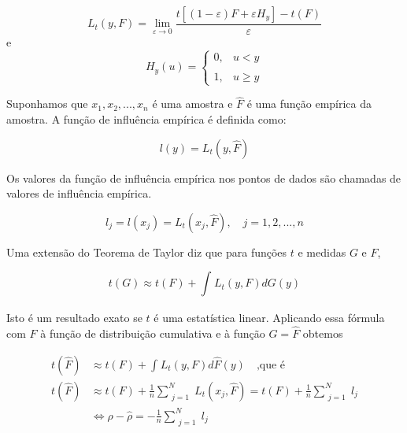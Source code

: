 \documentclass{article}
\begin{document}
\begin{enumerate}[(a)]
						\begin{equation*}
							L_t(y,F) = \lim_{\varepsilon \to 0} 
							\frac{t\left[(1 - \varepsilon)F + \varepsilon H_y \right] - t(F)}{\varepsilon}
						\end{equation*}	
						e
						\begin{equation*}
							H_y(u) = \begin{cases} 
										0, & u < y\\\\ 1, & u \geq y 
									\end{cases}
						\end{equation*}				
						
						Suponhamos que $x_1, x_2, ..., x_n$ é uma amostra e $\hat{F}$ é uma função empírica da amostra. A função de influência empírica é definida como:
						
						\begin{equation*}
							l(y) = L_t(y, \hat{F})
						\end{equation*}		
						
						Os valores da função de influência empírica nos pontos de dados são chamadas de valores de influência empírica.
						
						\begin{equation*}
							l_j = l(x_j) = L_t(x_j, \hat{F}), \quad j = 1,2,...,n
						\end{equation*}		
						
						Uma extensão do Teorema de Taylor diz que para funções $t$ e 
						medidas $G$ e $F$,
						
						\begin{equation*}
							t(G) \approx t(F) + \int^{}_{} L_t(y,F)dG(y)
						\end{equation*}		
						
						Isto é um resultado exato se $t$ é uma estatística linear.
						Aplicando essa fórmula com $F$ à função de distribuição cumulativa e à função $G = \hat{F}$ obtemos
						
						\begin{align*}
							t(\hat{F}) &\approx t(F) + \int^{}_{} L_t(y,F)d\hat{F}(y) 
							\quad \textrm{,que é}\\
							t(\hat{F}) &\approx t(F) + \frac{1}{n}
										\sum_{\substack{j=1}}^{N} L_t(x_j,\hat{F}) =
										t(F) + \frac{1}{n}\sum_{\substack{j=1}}^{N}l_j\\
							&\Leftrightarrow \rho - \hat{\rho} = -\frac{1}{n}															\sum_{\substack{j=1}}^{N}l_j 
						\end{align*}	
						

\end{enumerate}
\end{document}
